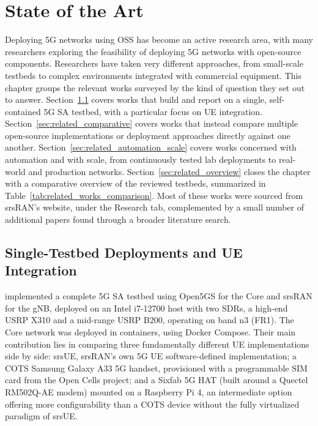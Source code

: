 %

\chapter{State of the Art}
\label{cha:state-of-the-art}

Deploying 5G networks using \gls{OSS} has become an active research area, with many researchers exploring the feasibility of deploying 5G networks with open-source components. Researchers have taken very different approaches, from small-scale testbeds to complex environments integrated with commercial equipment. This chapter groups the relevant works surveyed by the kind of question they set out to answer. Section~\ref{sec:related_single_testbed} covers works that build and report on a single, self-contained 5G \gls{SA} testbed, with a particular focus on \gls{UE} integration. Section~\ref{sec:related_comparative} covers works that instead compare multiple open-source implementations or deployment approaches directly against one another. Section~\ref{sec:related_automation_scale} covers works concerned with automation and with scale, from continuously tested lab deployments to real-world and production networks. Section~\ref{sec:related_overview} closes the chapter with a comparative overview of the reviewed testbeds, summarized in Table~\ref{tab:related_works_comparison}. Most of these works were sourced from srsRAN's website, under the Research tab, complemented by a small number of additional papers found through a broader literature search. %

\section{Single-Testbed Deployments and UE Integration}
\label{sec:related_single_testbed}

\textcite{tio2025exploring5g} implemented a complete 5G \gls{SA} testbed using Open5GS for the Core and srsRAN for the \gls{gNB}, deployed on an Intel i7-12700 host with two \glspl{SDR}, a high-end \gls{USRP} X310 and a mid-range USRP B200, operating on band n3 (FR1). The Core network was deployed in containers, using Docker Compose. Their main contribution lies in comparing three fundamentally different \gls{UE} implementations side by side: srsUE, srsRAN's own 5G \gls{UE} software-defined implementation; a \gls{COTS} Samsung Galaxy A33 5G handset, provisioned with a programmable SIM card from the Open Cells project; and a Sixfab 5G HAT (built around a Quectel RM502Q-AE modem) mounted on a Raspberry Pi 4, an intermediate option offering more configurability than a \gls{COTS} device without the fully virtualized paradigm of srsUE.

